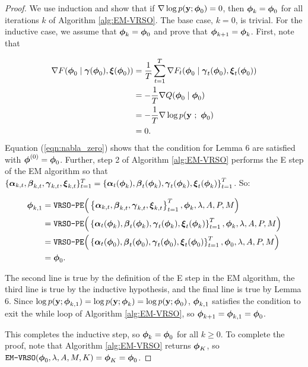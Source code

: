 \begin{proof}

We use induction and show that if $\nabla \log p(\mathbf{y};\boldsymbol{\phi}_0) = 0$, then $\boldsymbol{\phi}_{k} = \boldsymbol{\phi}_0$ for all iterations $k$ of Algorithm \ref{alg:EM-VRSO}. The base case, $k = 0$, is trivial. For the inductive case, we assume that $\boldsymbol{\phi}_k = \boldsymbol{\phi}_0$ and prove that $\boldsymbol{\phi}_{k+1} = \boldsymbol{\phi}_k$. First, note that 

\begin{align}
    \nabla F(\boldsymbol{\phi}_{0} \mid \boldsymbol{\gamma}(\boldsymbol{\phi}_{0}), \boldsymbol{\xi}(\boldsymbol{\phi}_{0})) &= \frac{1}{T} \sum_{t=1}^T \nabla F_t(\boldsymbol{\phi}_0 \mid \boldsymbol{\gamma}_t(\boldsymbol{\phi}_0), \boldsymbol{\xi}_t(\boldsymbol{\phi}_0)) \nonumber \\
    &= -\frac{1}{T} \nabla Q(\boldsymbol{\phi}_0 \mid \boldsymbol{\phi}_0) \nonumber \\
    &= -\frac{1}{T} \nabla \log p(\mathbf{y} ~;~ \boldsymbol{\phi}_0) \nonumber \\
    &= 0 \label{eqn:nabla_zero}.
\end{align}
%
Equation (\ref{eqn:nabla_zero}) shows that the condition for Lemma 6 are satisfied with $\boldsymbol{\phi}^{(0)} = \boldsymbol{\phi}_0$. Further, step 2 of Algorithm \ref{alg:EM-VRSO} performs the E step of the EM algorithm so that $\{\boldsymbol{\alpha}_{k,t}, \boldsymbol{\beta}_{k,t}, \boldsymbol{\gamma}_{k,t}, \boldsymbol{\xi}_{k,t}\}_{t=1}^T = \left\{\boldsymbol{\alpha}_t(\boldsymbol{\phi}_k), \boldsymbol{\beta}_t(\boldsymbol{\phi}_k), \boldsymbol{\gamma}_t(\boldsymbol{\phi}_k), \boldsymbol{\xi}_t(\boldsymbol{\phi}_k) \right\}_{t=1}^T$. So:

\begin{align*}
    \boldsymbol{\phi}_{k,1} &= \texttt{VRSO-PE}\Big(\left\{\boldsymbol{\alpha}_{k,t}, \boldsymbol{\beta}_{k,t}, \boldsymbol{\gamma}_{k,t}, \boldsymbol{\xi}_{k,t}\right\}_{t=1}^T, \boldsymbol{\phi}_k, \lambda, A, P, M \Big) \\
    &= \texttt{VRSO-PE}\Big(\left\{\boldsymbol{\alpha}_t(\boldsymbol{\phi}_k),\boldsymbol{\beta}_t(\boldsymbol{\phi}_k),\boldsymbol{\gamma}_t(\boldsymbol{\phi}_k),\boldsymbol{\xi}_t(\boldsymbol{\phi}_k)\right\}_{t=1}^T, \boldsymbol{\phi}_k, \lambda, A, P, M \Big)\\
    &= \texttt{VRSO-PE}\Big(\left\{\boldsymbol{\alpha}_t(\boldsymbol{\phi}_0),\boldsymbol{\beta}_t(\boldsymbol{\phi}_0),\boldsymbol{\gamma}_t(\boldsymbol{\phi}_0),\boldsymbol{\xi}_t(\boldsymbol{\phi}_0)\right\}_{t=1}^T, \boldsymbol{\phi}_0, \lambda, A, P, M \Big)\\
    &= \boldsymbol{\phi}_0.
\end{align*}

The second line is true by the definition of the E step in the EM algorithm, the third line is true by the inductive hypothesis, and the final line is true by Lemma 6. Since $\log p(\mathbf{y}; \boldsymbol{\phi}_{k,1}) = \log p(\mathbf{y};\boldsymbol{\phi}_{k}) = \log p(\mathbf{y}; \boldsymbol{\phi}_{0})$, $\boldsymbol{\phi}_{k,1}$ satisfies the condition to exit the while loop of Algorithm \ref{alg:EM-VRSO}, so $\boldsymbol{\phi}_{k+1} = \boldsymbol{\phi}_{k,1} = \boldsymbol{\phi}_{0}$. 

This completes the inductive step, so $\boldsymbol{\phi}_k = \boldsymbol{\phi}_0$ for all $k \geq 0$. To complete the proof, note that Algorithm \ref{alg:EM-VRSO} returns $\boldsymbol{\phi}_K$, so $\texttt{EM-VRSO}(\boldsymbol{\phi}_0, \lambda, A, M, K) = \boldsymbol{\phi}_K = \boldsymbol{\phi}_0$.
\end{proof}